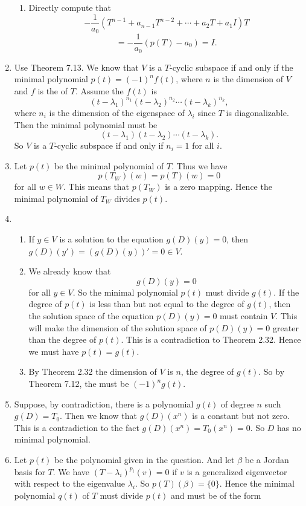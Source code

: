 \begin{enumerate}
\begin{enumerate}
\item Directly compute that 
\[-\frac{1}{a_0}(T^{n-1}+a_{n-1}T^{n-2}+\cdots +a_2T+a_1I)T\]
\[=-\frac{1}{a_0}(p(T)-a_0)=I.\]
\end{enumerate}
\item Use Theorem 7.13. We know that $V$ is a $T$-cyclic subspace if and only if the minimal polynomial $p(t)=(-1)^nf(t)$, where $n$ is the dimension of $V$ and $f$ is the \charpoly{} of $T$. Assume the \charpoly{} $f(t)$ is 
\[(t-\lambda_1)^{n_1}(t-\lambda_2)^{n_2}\cdots (t-\lambda_k)^{n_k},\]
where $n_i$ is the dimension of the eigenspace of $\lambda_i$ since $T$ is diagonalizable.
Then the minimal polynomial must be 
\[(t-\lambda_1)(t-\lambda_2)\cdots (t-\lambda_k).\]
So $V$ is a $T$-cyclic subspace if and only if $n_i=1$ for all $i$.
\item Let $p(t)$ be the minimal polynomial of $T$. Thus we have 
\[p(T_W)(w)=p(T)(w)=0\]
for all $w\in W$. This means that $p(T_W)$ is a zero mapping. Hence the minimal polynomial of $T_W$ divides $p(t)$.
\item \begin{enumerate}
\item If $y\in V$ is a solution to the equation $g(D)(y)=0$, then $g(D)(y')=(g(D)(y))'=0\in V$.
\item We already know that 
\[g(D)(y)=0\]
for all $y\in V$. 
So the minimal polynomial $p(t)$ must divide $g(t)$. If the degree of $p(t)$ is less than but not equal to the degree of $g(t)$, then the solution space of the equation $p(D)(y)=0$ must contain $V$. This will make the dimension of the solution space of $p(D)(y)=0$ greater than the degree of $p(t)$. This is a contradiction to Theorem 2.32. Hence we must have $p(t)=g(t)$.
\item By Theorem 2.32 the dimension of $V$ is $n$, the degree of $g(t)$. So by Theorem 7.12, the \charpoly{} must be $(-1)^ng(t)$.
\end{enumerate}
\item Suppose, by contradiction, there is a polynomial $g(t)$ of degree $n$ such $g(D)=T_0$. Then we know that $g(D)(x^n)$ is a constant but not zero. This is a contradiction to the fact $g(D)(x^n)=T_0(x^n)=0$. So $D$ has no minimal polynomial.
\item Let $p(t)$ be the polynomial given in the question. And let $\beta$ be a Jordan basis for $T$. We have $(T-\lambda_i)^{p_i}(v)=0$ if $v$ is a generalized eigenvector with respect to the eigenvalue $\lambda_i$. So $p(T)(\beta)=\{0\}$. Hence the minimal polynomial $q(t)$ of $T$ must divide $p(t)$ and must be of the form 

\end{enumerate}
